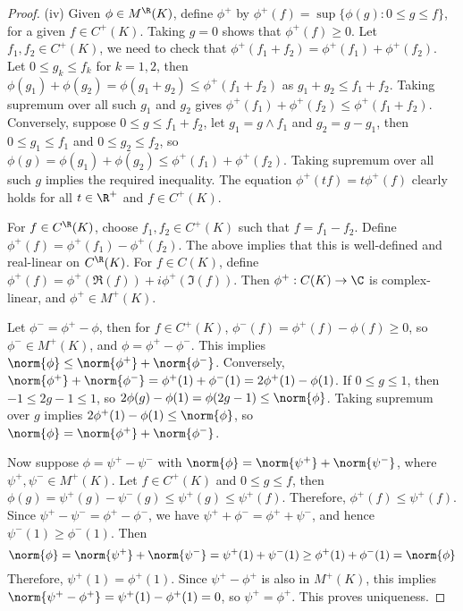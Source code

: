 \documentclass[a4paper]{article}
\begin{document}
\begin{proof}
	(iv) Given $\phi\in M^\R(K)$, define $\phi^+$ by $\phi^+(f)=\sup\{\phi(g):0\leq g\leq f\}$, for a given $f\in C^+(K)$. Taking $g=0$ shows that $\phi^+(f)\geq 0$. Let $f_1,f_2\in C^+(K)$, we need to check that $\phi^+(f_1+f_2)=\phi^+(f_1)+\phi^+(f_2)$. Let $0\leq g_k\leq f_k$ for $k=1,2$, then $\phi(g_1)+\phi(g_2)=\phi(g_1+g_2)\leq\phi^+(f_1+f_2)$ as $g_1+g_2\leq f_1+f_2$. Taking supremum over all such $g_1$ and $g_2$ gives $\phi^+(f_1)+\phi^+(f_2)\leq\phi^+(f_1+f_2)$. Conversely, suppose $0\leq g\leq f_1+f_2$, let $g_1=g\land f_1$ and $g_2=g-g_1$, then $0\leq g_1\leq f_1$ and $0\leq g_2\leq f_2$, so $\phi(g)=\phi(g_1)+\phi(g_2)\leq\phi^+(f_1)+\phi^+(f_2)$. Taking supremum over all such $g$ implies the required inequality. The equation $\phi^+(tf)=t\phi^+(f)$ clearly holds for all $t\in\R^+$ and $f\in C^+(K)$.

	For $f\in C^\R(K)$, choose $f_1,f_2\in C^+(K)$ such that $f=f_1-f_2$. Define $\phi^+(f)=\phi^+(f_1)-\phi^+(f_2)$. The above implies that this is well-defined and real-linear on $C^\R(K)$. For $f\in C(K)$, define $\phi^+(f)=\phi^+(\Re(f))+i\phi^+(\Im(f))$. Then $\phi^+:C(K)\to\C$ is complex-linear, and $\phi^+\in M^+(K)$.

	Let $\phi^-=\phi^+-\phi$, then for $f\in C^+(K)$, $\phi^-(f)=\phi^+(f)-\phi(f)\geq 0$, so $\phi^-\in M^+(K)$, and $\phi=\phi^+-\phi^-$. This implies $\norm{\phi}\leq\norm{\phi^+}+\norm{\phi^-}$. Conversely, $\norm{\phi^+}+\norm{\phi^-}=\phi^+(1)+\phi^-(1)=2\phi^+(1)-\phi(1)$. If $0\leq g\leq 1$, then $-1\leq 2g-1\leq 1$, so $2\phi(g)-\phi(1)=\phi(2g-1)\leq\norm{\phi}$. Taking supremum over $g$ implies $2\phi^+(1)-\phi(1)\leq\norm{\phi}$, so $\norm{\phi}=\norm{\phi^+}+\norm{\phi^-}$.

	Now suppose $\phi=\psi^+-\psi^-$ with $\norm{\phi}=\norm{\psi^+}+\norm{\psi^-}$, where $\psi^+,\psi^-\in M^+(K)$. Let $f\in C^+(K)$ and $0\leq g\leq f$, then $\phi(g)=\psi^+(g)-\psi^-(g)\leq\psi^+(g)\leq\psi^+(f)$. Therefore, $\phi^+(f)\leq \psi^+(f)$. Since $\psi^+-\psi^-=\phi^+-\phi^-$, we have $\psi^++\phi^-=\phi^+ +\psi^-$, and hence $\psi^-(1)\geq\phi^-(1)$. Then
	\[
	 \norm{\phi}=\norm{\psi^+}+\norm{\psi^-}=\psi^+(1)+\psi^-(1) \geq\phi^+(1)+\phi^-(1)=\norm{\phi}
	\]
	Therefore, $\psi^+(1)=\phi^+(1)$. Since $\psi^+-\phi^+$ is also in $M^+(K)$, this implies $\norm{\psi^+-\phi^+}=\psi^+(1)-\phi^+(1)=0$, so $\psi^+=\phi^+$. This proves uniqueness.
\end{proof}
\end{document}
